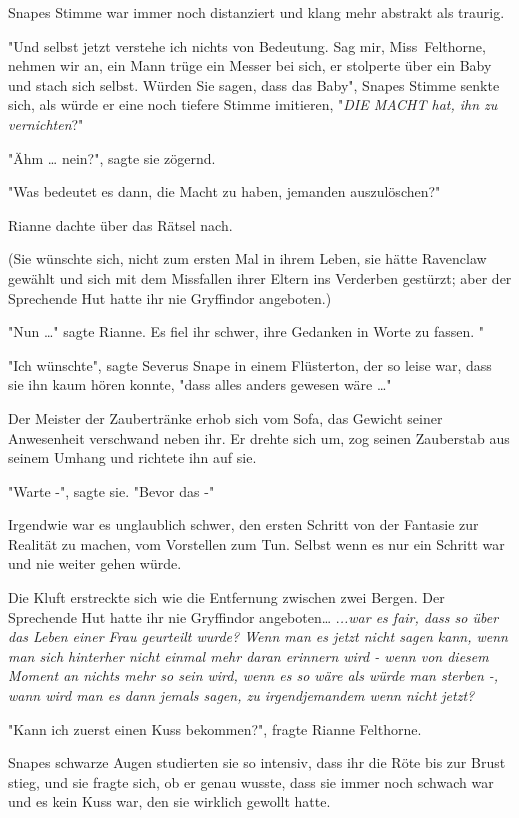 {Snapes Stimme war immer noch distanziert und klang mehr abstrakt als traurig.

"Und selbst jetzt verstehe ich nichts von Bedeutung. Sag mir, Miss~Felthorne, nehmen wir an, ein Mann trüge ein Messer bei sich, er stolperte über ein Baby und stach sich selbst. Würden Sie sagen, dass das Baby", Snapes Stimme senkte sich, als würde er eine noch tiefere Stimme imitieren, "\emph{DIE MACHT hat, ihn zu vernichten}?"

"Ähm … nein?", sagte sie zögernd.

"Was bedeutet es dann, die Macht zu haben, jemanden auszulöschen?"

Rianne dachte über das Rätsel nach.

(Sie wünschte sich, nicht zum ersten Mal in ihrem Leben, sie hätte Ravenclaw gewählt und sich mit dem Missfallen ihrer Eltern ins Verderben gestürzt; aber der Sprechende Hut hatte ihr nie Gryffindor angeboten.)

"Nun …" sagte Rianne. Es fiel ihr schwer, ihre Gedanken in Worte zu fassen. "

"Ich wünschte", sagte Severus Snape in einem Flüsterton, der so leise war, dass sie ihn kaum hören konnte, "dass alles anders gewesen wäre …"

Der Meister der Zaubertränke erhob sich vom Sofa, das Gewicht seiner Anwesenheit verschwand neben ihr. Er drehte sich um, zog seinen Zauberstab aus seinem Umhang und richtete ihn auf sie.

"Warte -", sagte sie. "Bevor das -"

Irgendwie war es unglaublich schwer, den ersten Schritt von der Fantasie zur Realität zu machen, vom Vorstellen zum Tun. Selbst wenn es nur ein Schritt war und nie weiter gehen würde.

Die Kluft erstreckte sich wie die Entfernung zwischen zwei Bergen. Der Sprechende Hut hatte ihr nie Gryffindor angeboten… .\emph{..war es fair, dass so über das Leben einer Frau geurteilt wurde? Wenn man es jetzt nicht sagen kann, wenn man sich hinterher nicht einmal mehr daran erinnern wird - wenn von diesem Moment an nichts mehr so sein wird, wenn es so wäre als würde man sterben -, wann wird man es dann jemals sagen, zu irgendjemandem wenn nicht jetzt?}

"Kann ich zuerst einen Kuss bekommen?", fragte Rianne Felthorne.

Snapes schwarze Augen studierten sie so intensiv, dass ihr die Röte bis zur Brust stieg, und sie fragte sich, ob er genau wusste, dass sie immer noch schwach war und es kein Kuss war, den sie wirklich gewollt hatte.

}
